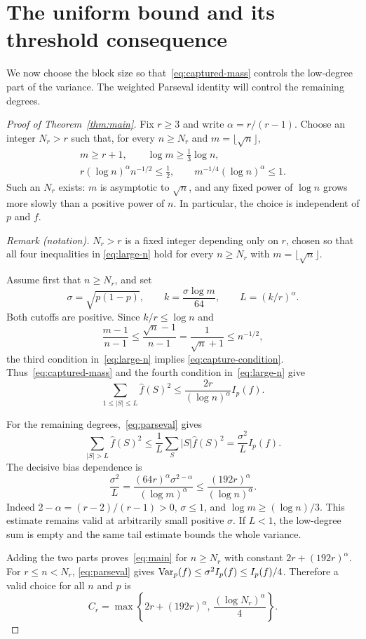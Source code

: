 \section{The uniform bound and its threshold consequence}
\label{sec:completion}

We now choose the block size so that~\eqref{eq:captured-mass}
controls the low-degree part of the variance. The weighted Parseval
identity will control the remaining degrees.

\begin{proof}[Proof of Theorem~\ref{thm:main}]
Fix $r\ge3$ and write $\alpha=r/(r-1)$. Choose an integer $N_r>r$
such that, for every $n\ge N_r$ and $m=\lfloor\sqrt n\rfloor$,
\begin{equation}\label{eq:large-n}
 \begin{gathered}
 m\ge r+1,\qquad \log m\ge\tfrac13\log n,\\
 r(\log n)^\alpha n^{-1/2}\le\tfrac12,\qquad
 m^{-1/4}(\log n)^\alpha\le1.
 \end{gathered}
\end{equation}
Such an $N_r$ exists: $m$ is asymptotic to $\sqrt n$, and any
fixed power of $\log n$ grows more slowly than a positive power of
$n$. In particular, the choice is independent of $p$ and $f$.

\noindent\textit{Remark (notation).} $N_r>r$ is a fixed integer depending only on $r$, chosen so that all four inequalities in \eqref{eq:large-n} hold for every $n\ge N_r$ with $m=\lfloor\sqrt n\rfloor$.


Assume first that $n\ge N_r$, and set
\[
 \sigma=\sqrt{p(1-p)},\qquad
 k=\frac{\sigma\log m}{64},\qquad L=(k/r)^\alpha.
\]
Both cutoffs are positive. Since $k/r\le\log n$ and
\[
 \frac{m-1}{n-1}\le\frac{\sqrt n-1}{n-1}
 =\frac1{\sqrt n+1}\le n^{-1/2},
\]
the third condition in~\eqref{eq:large-n} implies
\eqref{eq:capture-condition}. Thus~\eqref{eq:captured-mass} and
the fourth condition in~\eqref{eq:large-n} give
\begin{equation}\label{eq:low-final}
 \sum_{1\le|S|\le L}\widehat f(S)^2
 \le\frac{2r}{(\log n)^\alpha}I_p(f).
\end{equation}

For the remaining degrees,~\eqref{eq:parseval} gives
\[
 \sum_{|S|>L}\widehat f(S)^2
 \le\frac1L\sum_S|S|\widehat f(S)^2
 =\frac{\sigma^2}{L}I_p(f).
\]
The decisive bias dependence is
\begin{equation}\label{eq:bias-cancellation}
 \frac{\sigma^2}{L}
 =\frac{(64r)^\alpha\sigma^{2-\alpha}}{(\log m)^\alpha}
 \le\frac{(192r)^\alpha}{(\log n)^\alpha}.
\end{equation}
Indeed $2-\alpha=(r-2)/(r-1)>0$, $\sigma\le1$, and
$\log m\ge(\log n)/3$. This estimate remains valid at arbitrarily
small positive $\sigma$. If $L<1$, the low-degree sum is empty and
the same tail estimate bounds the whole variance.

Adding the two parts proves~\eqref{eq:main} for $n\ge N_r$ with
constant $2r+(192r)^\alpha$. For $r\le n<N_r$,
\eqref{eq:parseval} gives $\operatorname{Var}_p(f)\le\sigma^2 I_p(f)\le I_p(f)/4$.
Therefore a valid choice for all $n$ and $p$ is
\[
 C_r=\max\left\{2r+(192r)^\alpha,\,
                       \frac{(\log N_r)^\alpha}{4}\right\}.
\]
\end{proof}

